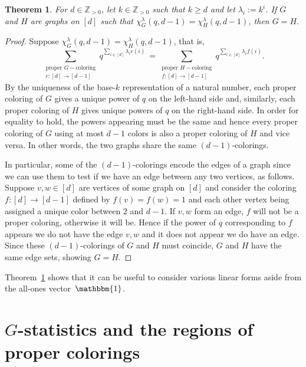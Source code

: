 \documentclass[11pt]{amsart}
\newtheorem{theorem}{Theorem}  [section] \numberwithin{equation}{section}
\begin{document}
\begin{theorem}\label{thm:distinguishedlabeled}
    For $d \in \mathbb{Z}_{>0}$, let $k \in \mathbb{Z}_{>0}$ such that $k \geq d$ and let $\lambda_i := k^i$. 
    If $G$ and $H$ are graphs on $[d]$ such that $\chi^\lambda_G(q,d-1) = \chi^\lambda_H(q,d-1)$, then $G=H$.
\end{theorem}
\begin{proof}
    Suppose $\chi^\lambda_G(q,d-1) = \chi^\lambda_H(q,d-1)$, that is,
    \[
        \sum_{\substack{\text{proper } G-\text{coloring} \\ c:[d] \to [d-1]}} q^{\sum_{i \in [d]} \lambda_i
c(i)} \, = \sum_{\substack{\text{proper } H-\text{coloring} \\ f:[d] \to [d-1]}} q^{\sum_{i \in [d]} \lambda_i f(i)}.
    \]
By the uniqueness of the base-$k$ representation of a natural number, each proper coloring of $G$ gives a unique
power of $q$ on the left-hand side and, similarly, each proper coloring of $H$ gives unique powers of $q$ on the right-hand side. 
    In order for equality to hold, the powers appearing must be the same and hence every proper coloring of $G$ using at most $d-1$ colors is also a proper coloring of $H$ and vice versa. 
    In other words, the two graphs share the same $(d-1)$-colorings.
    
    In particular, some of the $(d-1)$-colorings encode the edges of a graph since we can use them to test if we
have an edge between any two vertices, as follows.
    Suppose $v,w \in [d]$ are vertices of some graph on $[d]$ and consider the coloring $f: [d] \to [d-1]$
defined by $f(v) = f(w)=1$ and each other vertex being assigned a unique color between $2$ and $d-1$.
    If $v,w$ form an edge, $f$ will not be a proper coloring, otherwise it will be.
    Hence if the power of $q$ corresponding to $f$ appears we do not have the edge $v,w$ and it does not appear we do have an edge.
    Since these $(d-1)$-colorings of $G$ and $H$ must coincide, $G$ and $H$ have the same edge sets, showing $G=H$.
\end{proof}

Theorem~\ref{thm:distinguishedlabeled} shows that it can be useful to consider various linear forms aside from the all-ones vector~$\mathbbm{1}$.


\section{$G$-statistics and the regions of proper colorings}\label{sec:gstats}
\end{document}
